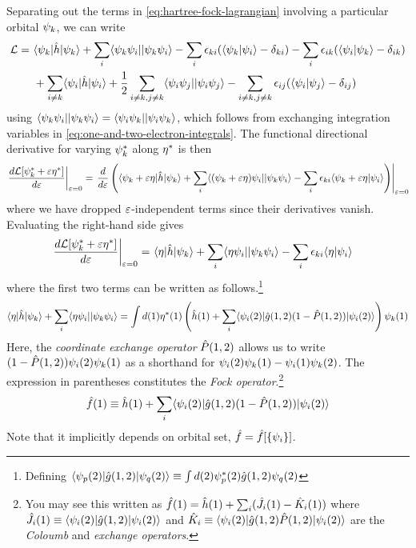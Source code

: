 \documentclass[11pt]{article}
\numberwithin{equation}{section}
\begin{document}
Separating out the terms in \cref{eq:hartree-fock-lagrangian} involving a particular orbital $\psi _k$, we can write
\begin{align*}
  \mathcal{L}
=&\
  \langle\psi _k|\hat{h}|\psi _k\rangle
+
  \sum_i
  \langle\psi _k\psi _i||\psi _k\psi _i\rangle
-
  \sum_i
  \epsilon _{ki}(\langle\psi _k|\psi _i\rangle-\delta _{ki})
-
  \sum_i
  \epsilon _{ik}(\langle\psi _i|\psi _k\rangle-\delta _{ik})
\\&\
+
  \sum_{i\neq k}
  \langle\psi _i|\hat{h}|\psi _i\rangle
+
  \frac {1}{2}
  \sum_{i\neq k,j\neq k}
  \langle\psi _i\psi _j||\psi _i\psi _j\rangle
-
  \sum_{i\neq k,j\neq k}
  \epsilon _{ij}(\langle\psi _i|\psi _j\rangle-\delta _{ij})
\end{align*}
using $\langle\psi _k\psi _i||\psi _k\psi _i\rangle=\langle\psi _i\psi _k||\psi _i\psi _k\rangle$, which follows from exchanging integration variables in \cref{eq:one-and-two-electron-integrals}.
The functional directional derivative for varying $\psi _k^*$ along $\eta ^*$ is then
\begin{align*}
\left.
  \frac {d\mathcal{L}[\psi _k^*+\varepsilon \eta^*]}{d\varepsilon}
\right|_{\varepsilon=0}
=
\left.
\frac {d}{d\varepsilon}
\left(
  \langle\psi _k+\varepsilon\eta|\hat{h}|\psi _k\rangle
+
  \sum_i
  \langle(\psi _k+\varepsilon\eta)\psi _i||\psi _k\psi _i\rangle
-
  \sum_i
  \epsilon _{ki}\langle\psi _k+\varepsilon\eta|\psi _i\rangle
\right)
\right|_{\varepsilon=0}
\end{align*}
where we have dropped $\varepsilon$-independent terms since their derivatives vanish.
Evaluating the right-hand side gives
\begin{align*}
\left.
  \frac {d\mathcal{L}[\psi _k^*+\varepsilon \eta ^*]}{d\varepsilon}
\right|_{\varepsilon=0}
=&\
  \langle\eta|\hat{h}|\psi _k\rangle
+
  \sum_i
  \langle\eta\psi _i||\psi _k\psi _i\rangle
-
  \sum_i
  \epsilon _{ki}
  \langle\eta|\psi _i\rangle
\end{align*}
where the first two terms can be written as follows.\footnote{Defining $\langle\psi _p(2)|\hat{g}(1,2)|\psi _q(2)\rangle\equiv\int d(2) \psi _p^*(2)\hat{g}(1,2)\psi _q(2)$}
\begin{align*}
  \langle\eta|\hat{h}|\psi _k\rangle
+
  \sum_i
  \langle\eta\psi _i||\psi _k\psi _i\rangle
=
\int d(1)
  \eta^*(1)
  \left(
    \hat{h}(1)
  +
    \sum_i
    \langle\psi _i(2)|\hat{g}(1,2)(1-\hat{P}(1,2))|\psi _i(2)\rangle
  \right)
  \psi _k(1)
\end{align*}
Here, the \textit{coordinate exchange operator} $\hat{P}(1,2)$ allows us to write $(1-\hat{P}(1,2))\psi _i(2)\psi _k(1)$ as a shorthand for $\psi _i(2)\psi _k(1)-\psi _i(1)\psi _k(2)$.
The expression in parentheses constitutes the \textit{Fock operator}.\footnote{
You may see this written as
$\hat{f}(1)=\hat{h}(1)+\sum_i(\hat{J}_i(1)-\hat{K}_i(1))$
where $\hat{J}_i(1)\equiv\langle\psi _i(2)|\hat{g}(1,2)|\psi _i(2)\rangle$ and $\hat{K}_i\equiv\langle\psi _i(2)|\hat{g}(1,2)\hat{P}(1,2)|\psi _i(2)\rangle$ are the \textit{Coloumb} and \textit{exchange operators}.
}
\begin{align}
\label{fock}
  \hat{f}(1)
\equiv
  \hat{h}(1)
+\sum_i
  \langle\psi _i(2)|\hat{g}(1,2)(1-\hat{P}(1,2))|\psi _i(2)\rangle
\end{align}
Note that it implicitly depends on orbital set, $\hat{f}=\hat{f}[\{\psi _i\}]$.
\end{document}
